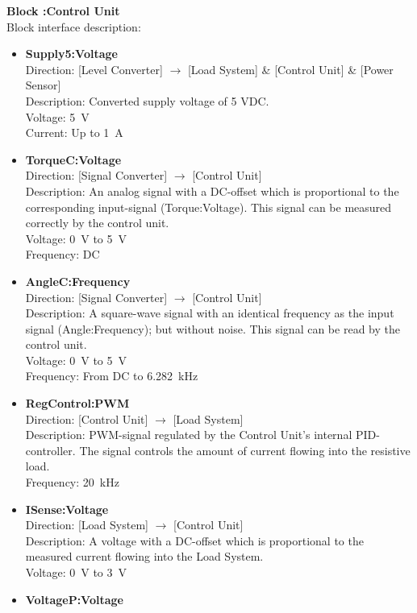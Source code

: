 \textbf{Block :Control Unit}\\
Block interface description:
\begin{itemize}
	\item \textbf{Supply5:Voltage}\\
	Direction: [Level Converter] $\rightarrow$ [Load System] \& [Control Unit] \& [Power Sensor]\\
	Description: Converted supply voltage of 5 VDC.\\
	Voltage: \SI{5}{\volt}\\
	Current: Up to \SI{1}{\ampere}\\
	\item \textbf{TorqueC:Voltage}\\
	Direction: [Signal Converter] $\rightarrow$ [Control Unit]\\
	Description: An analog signal with a DC-offset which is proportional to the corresponding input-signal (Torque:Voltage). This signal can be measured correctly by the control unit.\\
	Voltage: \SI{0}{\volt} to \SI{5}{\volt}\\
	Frequency: DC
	\item \textbf{AngleC:Frequency}\\
	Direction: [Signal Converter] $\rightarrow$ [Control Unit]\\
	Description: A square-wave signal with an identical frequency as the input signal (Angle:Frequency); but without noise. This signal can be read by the control unit.\\
	Voltage: \SI{0}{\volt} to \SI{5}{\volt}\\
	Frequency: From DC to \SI{6.282}{\kilo \hertz}
	\item \textbf{RegControl:PWM}\\
	Direction: [Control Unit] $\rightarrow$ [Load System]\\
	Description: PWM-signal regulated by the Control Unit's internal PID-controller. The signal controls the amount of current flowing into the resistive load.\\
	Frequency: \SI{20}{\kilo \hertz}
	\item \textbf{ISense:Voltage}\\
	Direction: [Load System] $\rightarrow$ [Control Unit]\\
	Description: A voltage with a DC-offset which is proportional to the measured current flowing into the Load System.\\
	Voltage: \SI{0}{\volt} to \SI{3}{\volt}
	\item \textbf{VoltageP:Voltage}\\

\end{itemize}
